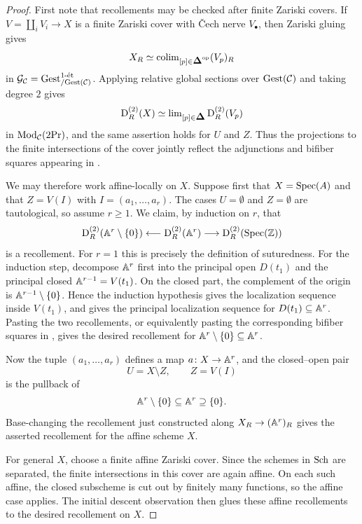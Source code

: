 \documentclass[11pt]{book}
\begin{document}
	\begin{proof}
		First note that recollements may be checked after finite Zariski covers. If $V=\coprod_iV_i\to X$ is a finite Zariski cover with \v{C}ech nerve $V_\bullet$, then Zariski gluing gives
		\[
			X_R\simeq\colim_{[p]\in\simp\catop}(V_p)_R
		\]
		in $\Gg_{\Cc}=\Gest^{1\text{-}\et}_{/\Gest(\Cc)}$. Applying relative global sections over $\Gest(\Cc)$ and taking degree $2$ gives
		\[
			\D^{(2)}_R(X)\simeq\lim_{[p]\in\simp}\D^{(2)}_R(V_p)
		\]
		in $\Mod_{\Cc}(2\Pr)$, and the same assertion holds for $U$ and $Z$. Thus the projections to the finite intersections of the cover jointly reflect the adjunctions and bifiber squares appearing in .

		We may therefore work affine-locally on $X$. Suppose first that $X=\Spec(A)$ and that $Z=V(I)$ with $I=(a_1,\ldots,a_r)$. The cases $U=\emptyset$ and $Z=\emptyset$ are tautological, so assume $r\geq1$.
		We claim, by induction on $r$, that
		\[
			\D^{(2)}_R(\bbA^r\setminus\{0\})
			\longleftarrow
			\D^{(2)}_R(\bbA^r)
			\longrightarrow
			\D^{(2)}_R(\Spec(\Z))
		\]
		is a recollement. For $r=1$ this is precisely the definition of suturedness. For the induction step, decompose $\bbA^r$ first into the principal open $D(t_1)$ and the principal closed $\bbA^{r-1}=V(t_1)$. On the closed part, the complement of the origin is $\bbA^{r-1}\setminus\{0\}$. Hence the induction hypothesis gives the localization sequence inside $V(t_1)$, and  gives the principal localization sequence for $D(t_1)\subseteq\bbA^r$. Pasting the two recollements, or equivalently pasting the corresponding bifiber squares in , gives the desired recollement for $\bbA^r\setminus\{0\}\subseteq\bbA^r$.

		Now the tuple $(a_1,\ldots,a_r)$ defines a map $a\colon X\to\bbA^r$, and the closed--open pair
		\[
			U=X\setminus Z,
			\qquad
			Z=V(I)
		\]
		is the pullback of
		\[
			\bbA^r\setminus\{0\}\subseteq\bbA^r\supseteq\{0\}.
		\]
		Base-changing the recollement just constructed along $X_R\to(\bbA^r)_R$ gives the asserted recollement for the affine scheme $X$.

		For general $X$, choose a finite affine Zariski cover. Since the schemes in $\Sch$ are separated, the finite intersections in this cover are again affine. On each such affine, the closed subscheme is cut out by finitely many functions, so the affine case applies. The initial descent observation then glues these affine recollements to the desired recollement on $X$.
	\end{proof}
\end{document}
